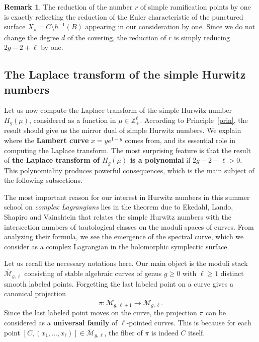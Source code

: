 \documentclass{amsart}
\theoremstyle{definition}
\newtheorem{rem}[thm]{Remark}
\numberwithin{equation}{section}
\numberwithin{figure}{section}
\newcommand{\Mbar}{{\overline{\mathcal{M}}}}
\newcommand{\bZ}{{\mathbb{Z}}}
\newcommand{\lrar}{\longrightarrow}
\begin{document}
\begin{rem}
The reduction of the number $r$ of simple ramification 
points by one is exactly reflecting the 
reduction of the Euler characteristic of 
the punctured surface $X_\rho = C\setminus h^{-1}(B)$
appearing in our consideration
by one. Since we do not change
the degree $d$ of the covering, the reduction of $r$ 
is simply reducing $2g-2+\ell$ by one.
\end{rem}






\subsection{The Laplace transform of the
simple Hurwitz numbers}
\label{Fugue2}

Let us now compute the Laplace transform
of the simple Hurwitz number $H_g(\mu)$,
considered as a function in $\mu\in\bZ_+ ^\ell$.
According to Principle~\ref{prin},
the result should give us  the mirror dual 
of simple Hurwitz numbers.
We explain where the \textbf{Lambert curve}
$x=y e^{1-y}$ comes from, and its
essential role in
computing the Laplace transform.
The most surprising feature is that the result
of \textbf{the Laplace transform of $H_g(\mu)$ is
a polynomial} if $2g-2+\ell >0$. 
This polynomiality produces powerful
consequences, which is the main 
subject of the following subsections.



The most important reason for our  interest
in Hurwitz numbers in this summer school on \emph{complex Lagrangians}
 lies in the  
theorem due to Ekedahl, Lando, Shapiro and 
Vainshtein \cite{ELSV} that relates the simple Hurwitz numbers
with the intersection numbers of tautological 
classes on the moduli spaces of curves.
From analyzing their formula, we see the emergence of
the spectral curve, which we consider as a complex Lagrangian 
in the holomorphic symplectic surface.

Let us recall the necessary notations here. 
Our main object is the moduli stack $\Mbar_{g,\ell}$
consisting of stable algebraic curves of genus $g\ge 0$
with $\ell\ge 1$ distinct smooth labeled points. 
Forgetting the last labeled point on a curve 
gives a canonical projection 
$$
\pi:\Mbar_{g,\ell+1}\lrar 
\Mbar_{g,\ell}.
$$
Since the last labeled point moves on the curve,
the projection $\pi$ can be considered as a
\textbf{universal family} of $\ell$-pointed curves. This is 
because for each point $[C,(x_1,\dots,x_\ell)]
\in \Mbar_{g,\ell}$, the fiber of $\pi$ is 
indeed $C$ itself. 
\end{document}

